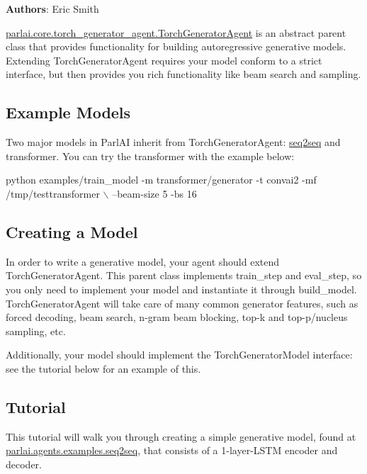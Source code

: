 {\bfseries Authors}\+: Eric Smith

{\ttfamily \hyperlink{classparlai_1_1core_1_1torch__generator__agent_1_1TorchGeneratorAgent}{parlai.\+core.\+torch\+\_\+generator\+\_\+agent.\+Torch\+Generator\+Agent}} is an abstract parent class that provides functionality for building autoregressive generative models. Extending {\ttfamily Torch\+Generator\+Agent} requires your model conform to a strict interface, but then provides you rich functionality like beam search and sampling.

\subsection*{Example Models}

Two major models in Parl\+AI inherit from {\ttfamily Torch\+Generator\+Agent}\+: \hyperlink{namespaceseq2seq}{seq2seq} and transformer. You can try the transformer with the example below\+:


\begin{DoxyCode}
python examples/train\_model -m transformer/generator -t convai2 -mf /tmp/testtransformer \(\backslash\)
  --beam-size 5 -bs 16
\end{DoxyCode}


\subsection*{Creating a Model}

In order to write a generative model, your agent should extend {\ttfamily Torch\+Generator\+Agent}. This parent class implements {\ttfamily train\+\_\+step} and {\ttfamily eval\+\_\+step}, so you only need to implement your model and instantiate it through {\ttfamily build\+\_\+model}. {\ttfamily Torch\+Generator\+Agent} will take care of many common generator features, such as forced decoding, beam search, n-\/gram beam blocking, top-\/k and top-\/p/nucleus sampling, etc.

Additionally, your model should implement the {\ttfamily Torch\+Generator\+Model} interface\+: see the tutorial below for an example of this.

\subsection*{Tutorial}

This tutorial will walk you through creating a simple generative model, found at {\ttfamily \hyperlink{namespaceparlai_1_1agents_1_1examples_1_1seq2seq}{parlai.\+agents.\+examples.\+seq2seq}}, that consists of a 1-\/layer-\/\+L\+S\+TM encoder and decoder.

